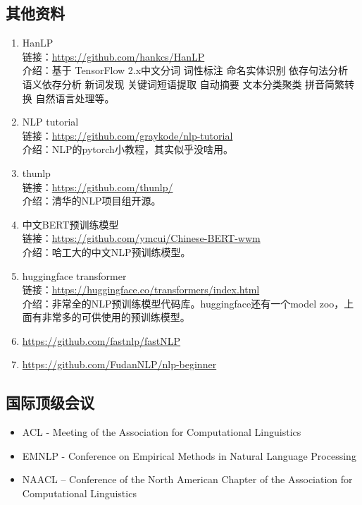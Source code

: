 \documentclass[lang=cn,11pt,a4paper]{elegant_template}
\begin{document}
\subsection{其他资料}
\begin{enumerate}
    \item HanLP\\
    链接：\href{https://github.com/hankcs/HanLP}{https://github.com/hankcs/HanLP}  \\
    介绍：基于 TensorFlow 2.x中文分词 词性标注 命名实体识别 依存句法分析 语义依存分析 新词发现 关键词短语提取 自动摘要 文本分类聚类 拼音简繁转换 自然语言处理等。
    \item NLP tutorial \\
    链接：\href{https://github.com/graykode/nlp-tutorial}{https://github.com/graykode/nlp-tutorial}  \\
    介绍：NLP的pytorch小教程，其实似乎没啥用。
    \item thunlp \\
    链接：\href{https://github.com/thunlp/}{https://github.com/thunlp/}  \\
    介绍：清华的NLP项目组开源。 
    \item 中文BERT预训练模型 \\
    链接：\href{https://github.com/ymcui/Chinese-BERT-wwm}{https://github.com/ymcui/Chinese-BERT-wwm}  \\
    介绍：哈工大的中文NLP预训练模型。
    \item huggingface transformer \\
    链接：\href{https://huggingface.co/transformers/index.html}{https://huggingface.co/transformers/index.html}  \\
    介绍：非常全的NLP预训练模型代码库。huggingface还有一个model zoo，上面有非常多的可供使用的预训练模型。
	\item \href{https://github.com/fastnlp/fastNLP}{https://github.com/fastnlp/fastNLP} 
    \item \href{https://github.com/FudanNLP/nlp-beginner}{https://github.com/FudanNLP/nlp-beginner}
\end{enumerate}

\subsection{国际顶级会议}
\begin{itemize}
    \item ACL - Meeting of the Association for Computational Linguistics
    \item EMNLP - Conference on Empirical Methods in Natural Language Processing
    \item NAACL – Conference of the North American Chapter of the Association for Computational Linguistics
\end{itemize}
\end{document}

